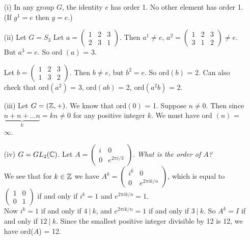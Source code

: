 \begin{examples}\begin{enumerate}
 \item[(i)] In any group $G$, the identity $e$ has order 1. No other element has order 1. (If $g^1 = e$ then $g = e$.)
 
 \item[(ii)] Let $G = S_3$ Let $a  = \left(\begin{smallmatrix}
1 & 2 & 3 \\ 2 & 3 & 1	
\end{smallmatrix}\right)$. Then $a^1 \neq e$, $a^2 = \left(\begin{smallmatrix}
1 & 2 & 3 \\ 3 & 1 & 2 	
\end{smallmatrix}\right) \neq e$. But $a^3 = e$. So ord $(a)$ = 3.

 Let $b = \left(\begin{smallmatrix}
1 & 2 & 3 \\ 1 & 3 & 2	
\end{smallmatrix}\right).$ Then $b \neq e$, but $b^2 = e$. So ord$(b)$ = 2. Can also check that ord$(a^2)$ = 3, ord$(ab)$ = 2, ord$(a^2b)$ = 2.


\item[(iii)] Let $G = (\mathbb{Z},+)$. We know that ord$(0)$ = 1. Suppose $n \neq 0$. Then since $\underbrace{n + n + \dots n}_{k} = kn \neq 0$ for any positive integer $k$. We must have ord $(n)$ = $\infty$.
\item[(iv)] $G = GL_2(\mathbb{C})$. Let $A = \left(\begin{smallmatrix}
i & 0 \\ 0 & e^{2 \pi i/3} 	
\end{smallmatrix}\right)$. \emph{What is the order of $A$?}\\

We see that for $k \in \mathbb{Z}$ we have $A^k = \left(\begin{smallmatrix}
i^k & 0 \\ 0 & e^{2\pi ik/n}	
\end{smallmatrix}\right)
$, which is equal to $\left(\begin{smallmatrix}
1 & 0 \\ 0 & 1	
\end{smallmatrix}\right)$ if and only if $i^k = 1$ and $e^{2 \pi ik/n} = 1$.\\

 Now $i^k = 1$ if and only if $4 ~|~ k$, and $e^{2\pi ik/n} = 1$ if and only if $3 ~|~ k$. So $A^k = I$ if and only if $12 ~|~ k$. Since the smallest positive integer divisible by 12 is 12, we have ord($A$) = 12.
 \end{enumerate}
 \end{examples}\vspace*{10pt}
 
